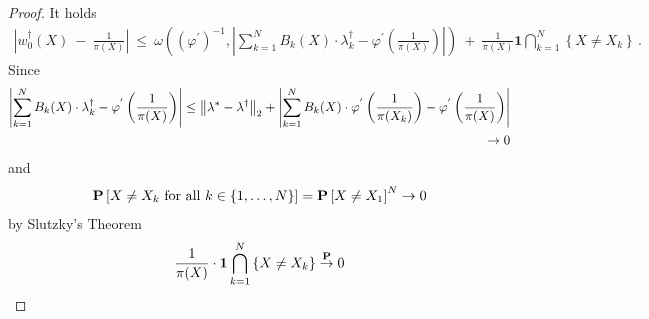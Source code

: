 \begin{proof}
  It holds
  \begin{align*}
    \left| 
    w_0^\dagger(X)
    \ 
    -
    \ 
    \frac{1}{\pi(X)}
    \right|
    \
    \le
    \
    \omega
    \left( 
      (\varphi^{'})^{-1}
      ,
      \left| 
      \sum_{k=1}^{N} 
      B_k(X)\cdot\lambda_k^\dagger-
      \varphi^{'}
      \left( \frac{1}{\pi(X)} \right)
      \right|
    \right)
    \
    +
    \
    \frac{1}{\pi(X)}
    \mathbf{1}
    \bigcap_{k=1}^N
    \left\{ X\neq X_k \right\}
    \,.
  \end{align*}
  Since
  \begin{align*}
      \left| 
      \sum_{k=1}^{N} 
      B_k(X)\cdot\lambda_k^\dagger-
      \varphi^{'}
      \left( \frac{1}{\pi(X)} \right)
      \right|
      \le
      \norm{\lambda^*-\lambda^\dagger}_2
      +
      \left| 
      \sum_{k=1}^{N} 
      B_k(X)\cdot
      \varphi^{'}
      \left( \frac{1}{\pi(X_k)} \right)
      -
      \varphi^{'}
      \left( \frac{1}{\pi(X)} \right)
      \right|
      \\
      \to 0
  \end{align*}
  and
  \begin{align*}
    \P
    \left[ 
      X\neq X_k \ \text{for all }
      k\in \left\{ 1,\ldots,N \right\}
    \right]
    =
    \P \left[ X\neq X_1 \right]^N
    \to
    0
  \end{align*}
  by Slutzky's Theorem
  \begin{align*}
    \frac{1}{\pi(X)}
    \cdot
    \mathbf{1}
    \bigcap_{k=1}^N
    \left\{ X\neq X_k \right\}
    \overset{\P}{\to}0
  \end{align*}
\end{proof}
